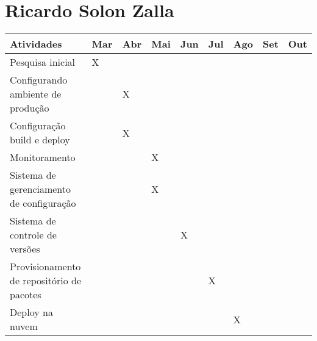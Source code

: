 \section{Ricardo Solon Zalla}
\begin{center}
\begin{tabular}{ | m{20em} | m{0.5cm}| m{0.5cm} |
m{0.5cm} | m{0.5cm} | 
m{0.5cm} |m{0.5cm} |m{0.5cm} |m{0.5cm} | } 
\hline
 Atividades & Mar & Abr & Mai & Jun & 
 Jul & Ago & Set & Out \\ 
\hline
Pesquisa inicial & X & & & & & & &  \\ 
\hline
Configurando ambiente de produção &  & X & & & & & & \\ 
\hline
Configuração build e deploy &  & X & & & & & & \\
\hline
Monitoramento &  & & X & & & & & \\
\hline
Sistema de gerenciamento de configuração &  & & X & & & & & \\
\hline
Sistema de controle de versões &  & & & X & & & & \\
\hline
Provisionamento de repositório de pacotes &  & & & & X & & & \\
\hline
Deploy na nuvem &  & & & & & X & & \\
 

\hline
\end{tabular}
\end{center}



